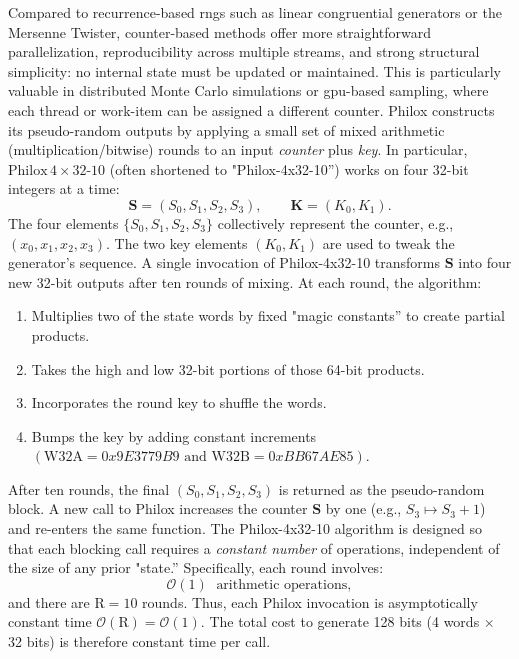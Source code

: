 Compared to recurrence-based \acrshort{rng}s such as linear congruential generators or the Mersenne Twister, counter-based methods offer more straightforward parallelization, reproducibility across multiple streams, and strong structural simplicity: no internal state must be updated or maintained. This is particularly valuable in distributed Monte Carlo simulations or \acrshort{gpu}-based sampling, where each thread or work-item can be assigned a different counter. Philox constructs its pseudo-random outputs by applying a small set of mixed arithmetic (multiplication/bitwise) rounds to an input \emph{counter} plus \emph{key}. In particular, \(\mathrm{Philox}\,4\times32\text{-10}\) (often shortened to "Philox-4x32-10”) works on four 32-bit integers at a time:
\[
  \mathbf{S} = (S_0, S_1, S_2, S_3),
  \qquad
  \mathbf{K} = (K_0, K_1).
\]
The four elements \(\{S_0, S_1, S_2, S_3\}\) collectively represent the counter, e.g., \((x_0, x_1, x_2, x_3)\). The two key elements \((K_0, K_1)\) are used to tweak the generator's sequence. A single invocation of Philox-4x32-10 transforms \(\mathbf{S}\) into four new 32-bit outputs after ten rounds of mixing. At each round, the algorithm:
\begin{enumerate}
    \item Multiplies two of the state words by fixed "magic constants” to create partial products.
    \item Takes the high and low 32-bit portions of those 64-bit products.
    \item Incorporates the round key to shuffle the words.
    \item Bumps the key by adding constant increments \((\mathrm{W32A} = 0x9E3779B9 \text{ and } \mathrm{W32B} = 0xBB67AE85)\).
\end{enumerate}
After ten rounds, the final \((S_0, S_1, S_2, S_3)\) is returned as the pseudo-random block. A new call to Philox increases the counter \(\mathbf{S}\) by one (e.g., \(S_3 \mapsto S_3 + 1\)) and re-enters the same function. The Philox-4x32-10 algorithm is designed so that each blocking call requires a \emph{constant number} of operations, independent of the size of any prior "state.” Specifically, each round involves:
\[
  \mathcal{O}(1)\;\text{ arithmetic operations},
\]
and there are \(\mathrm{R} = 10\) rounds. Thus, each Philox invocation is asymptotically constant time \(\mathcal{O}(\mathrm{R}) = \mathcal{O}(1)\). The total cost to generate 128 bits (4 words \(\times\) 32 bits) is therefore constant time per call.

